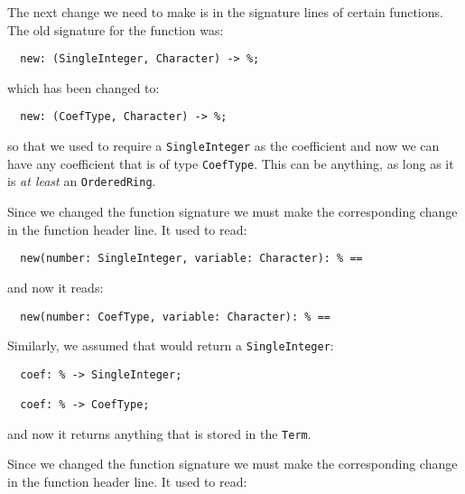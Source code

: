 The next change we need to make is in the signature lines of certain
functions. The old signature for the function  was:

\begin{small}
\begin{verbatim}
  new: (SingleInteger, Character) -> %;
\end{verbatim}
\end{small}

which has been changed to:

\begin{small}
\begin{verbatim}
  new: (CoefType, Character) -> %;                    
\end{verbatim}
\end{small}

so that we used to require a \verb"SingleInteger" as the coefficient and
now we can have any coefficient that is of type \verb"CoefType".  This
can be anything, as long as it is {\em at least} an \verb"OrderedRing".

Since we changed the function signature we must make the
corresponding change in the function header line. It used to
read:

\begin{small}
\begin{verbatim}
  new(number: SingleInteger, variable: Character): % ==
\end{verbatim}
\end{small}

and now it reads:

\begin{small}
\begin{verbatim}
  new(number: CoefType, variable: Character): % ==
\end{verbatim}
\end{small}

Similarly, we assumed that  would return a \verb"SingleInteger":

\begin{small}
\begin{verbatim}
  coef: % -> SingleInteger;

  coef: % -> CoefType;                                     
\end{verbatim}
\end{small}

and now it returns anything that is stored in the \verb"Term".

Since we changed the function signature we must make the
corresponding change in the function header line. It used to
read:

